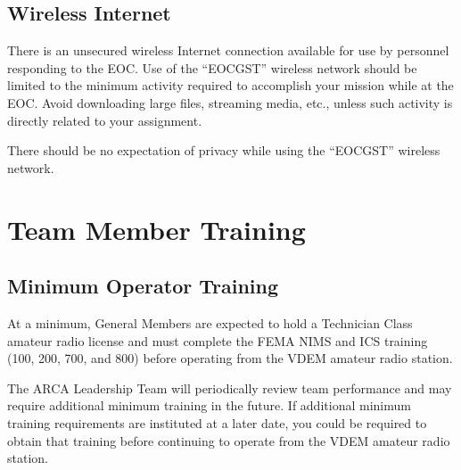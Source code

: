 \documentclass[pdflatex,letterpaper,twoside,12pt]{book}
\begin{document}

\section{Wireless Internet}

There is an unsecured wireless Internet connection available for use by personnel responding to the EOC.  Use of the ``EOCGST'' wireless network should be limited to the minimum activity required to accomplish your mission while at the EOC.  Avoid downloading large files, streaming media, etc., unless such activity is directly related to your assignment.

There should be no expectation of privacy while using the ``EOCGST'' wireless network.


\chapter{Team Member Training}

\section{Minimum Operator Training}

At a minimum, General Members are expected to hold a Technician Class amateur radio license and must complete the FEMA NIMS and ICS training (100, 200, 700, and 800) before operating from the VDEM amateur radio station.

The ARCA Leadership Team will periodically review team performance and may require additional minimum training in the future.  If additional minimum training requirements are instituted at a later date, you could be required to obtain that training before continuing to operate from the VDEM amateur radio station.

\end{document}
